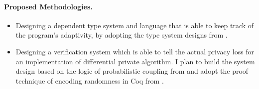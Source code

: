 \documentclass{article}
\begin{document}
\paragraph{Proposed Methodologies.}

\begin{itemize}

	\item Designing a dependent type system and language that is able to keep track of the program's adaptivity, by adopting the type system designs from \cite{xi1999dependent, near2019duet,reed2010distance, gaboardi2013linear}.

	\item Designing a verification system which is able to tell the actual privacy loss for an implementation of differential private algorithm. I plan to build the system design based on the logic of probabilistic coupling from \cite{barthe2016proving} and adopt the proof technique of encoding randomness in Coq from \cite{ye2017verified}.

\end{itemize}


\newpage


\end{document}
